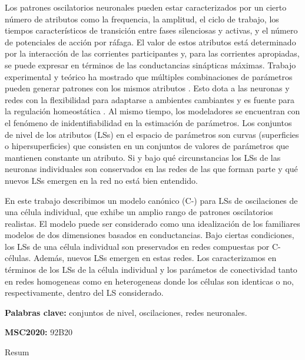 Los patrones oscilatorios neuronales pueden estar caracterizados por un cierto número de atributos como la frequencia, la amplitud, el ciclo de trabajo, los tiempos característicos de transición entre fases silenciosas y activas, y el número de potenciales de acción por ráfaga. El valor de estos atributos está determinado por la interacción de las corrientes participantes y, para las corrientes apropiadas, se puede expresar en términos de las conductancias sinápticas máximas. Trabajo experimental y teórico ha mostrado que múltiples combinaciones de parámetros pueden generar patrones con los mismos atributos \cite{Prinz,Rot,Oly,Olypher2010}. Esto dota a las neuronas y redes con la flexibilidad para adaptarse a ambientes cambiantes y es fuente para la regulación homeostática \cite{Olypher2010}. Al mismo tiempo, los modeladores se encuentran con el fenómeno de inidentifiabilidad en la estimación de parámetros. Los conjuntos de nivel de los atributos (LSs) en el espacio de parámetros son curvas (superficies o hipersuperficies) que consisten en un conjuntos de valores de parámetros que mantienen constante un atributo. Si y bajo qué circunstancias los LSs de las neuronas individuales son conservados en las redes de las que forman parte y qué nuevos LSs emergen en la red no está bien entendido.

En este trabajo describimos un modelo canónico (C-) para LSs de oscilaciones de una célula individual, que exhibe un amplio rango de patrones oscilatorios realistas. El modelo puede ser considerado como una idealización de los familiares modelos de dos dimensiones basados en conductancias. Bajo ciertas condiciones, los LSs de una célula individual son preservados en redes compuestas por C-células. Además, nuevos LSs emergen en estas redes. Los caracterizamos en términos de los LSs de la célula individual y los parámetos de conectividad tanto en redes homogeneas como en heterogeneas donde los células son identicas o no, respectivamente, dentro del LS considerado.

\textbf{Palabras clave:} conjuntos de nivel, oscilaciones, redes neuronales.

\textbf{MSC2020:} 92B20

\newpage
\vspace*{5mm}
{Resum}
\label{sec:abstract-diff}
\vspace*{12mm}

